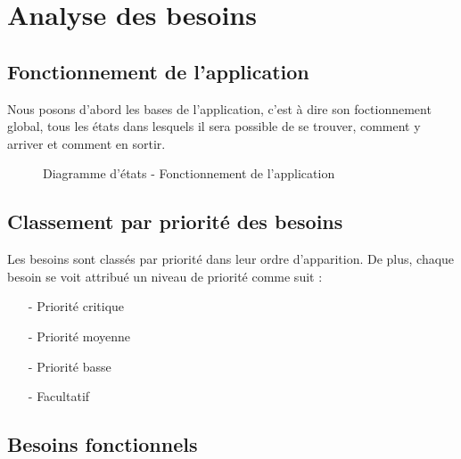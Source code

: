 \chapter{Analyse des besoins}

\section{Fonctionnement de l'application}

Nous posons d'abord les bases de l'application, c'est à dire son foctionnement global, tous les états dans lesquels il sera possible de se trouver, comment y arriver et comment en sortir.

 \begin{figure}[!ht]
 \begin{center}
  \caption{Diagramme d'états - Fonctionnement de l'application}
  \label{etattrans}
 \end{center}
 \end{figure}


\section{Classement par priorité des besoins}\label{priorite}

Les besoins sont classés par priorité dans leur ordre d'apparition. De plus, chaque besoin se voit attribué un niveau de priorité comme suit :

\begin{itemize}
 \item[-] Priorité critique
 \item[-] Priorité moyenne
 \item[-] Priorité basse
 \item[-] Facultatif
\end{itemize}

\section{Besoins fonctionnels}\label{besoins_fonctionnels}

